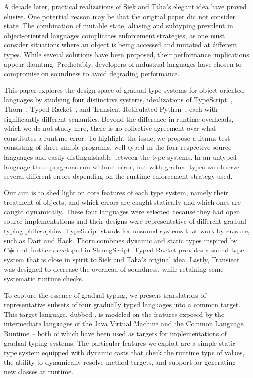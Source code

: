 \documentclass{tex/llncs}
\begin{document}
A decade later, practical realizations of Siek and Taha's elegant idea have
proved elusive. One potential reason may be that the original paper did not
consider state. The combination of mutable state, aliasing and subtyping
prevalent in object-oriented languages complicates enforcement strategies,
as one must consider situations where an object is being accessed and
mutated at different types. While several solutions have been proposed,
their performance implications appear daunting. Predictably, developers of
industrial languages have chosen to compromise on soundness to avoid
degrading performance.


This paper explores the design space of gradual type systems for
object-oriented languages by studying four distinctive systems,
idealizations of TypeScript~\cite{BAT14}, Thorn~\cite{oopsla09}, Typed
Racket~\cite{tf-popl08}, and Transient Reticulated Python~\cite{siek14},
each with significantly different semantics.  Beyond the difference in runtime
overheads, which we do not study here, there is no collective
agreement over what constitutes a runtime error.  To highlight the
issue, we propose a litmus test consisting of three simple programs,
well-typed in the four respective source languages and easily
distinguishable between the type systems. In an untyped language these programs
run without error, but with gradual types we observe several different errors 
depending on the runtime enforcement strategy used.

Our aim is to shed light on core features of each type system, namely their
treatment of objects, and which errors are caught statically and which ones
are caught dynamically.  These four languages were selected because they had
open source implementations and their designs were representative of
different gradual typing philosophies.  TypeScript stands for unsound systems that work by
erasure, such as Dart and Hack.  Thorn combines dynamic and static types
inspired by C\# and further developed in StrongScript. Typed Racket provides
a sound type system that is close in spirit to Siek and Taha's original
idea. Lastly, Transient was designed to decrease the overhead of soundness,
while retaining some systematic runtime checks.

To capture the essence of gradual typing, we present translations of
representative subsets of four gradually typed languages into a common
target. This target language, dubbed \kafka, is modeled on the features
exposed by the intermediate languages of the Java Virtual Machine and the
Common Language Runtime -- both of which have been used as targets for
implementations of gradual typing systems.  The particular features we
exploit are a simple static type system equipped with dynamic casts that
check the runtime type of values, the ability to dynamically resolve method
targets, and support for generating new classes at runtime.
\end{document}
